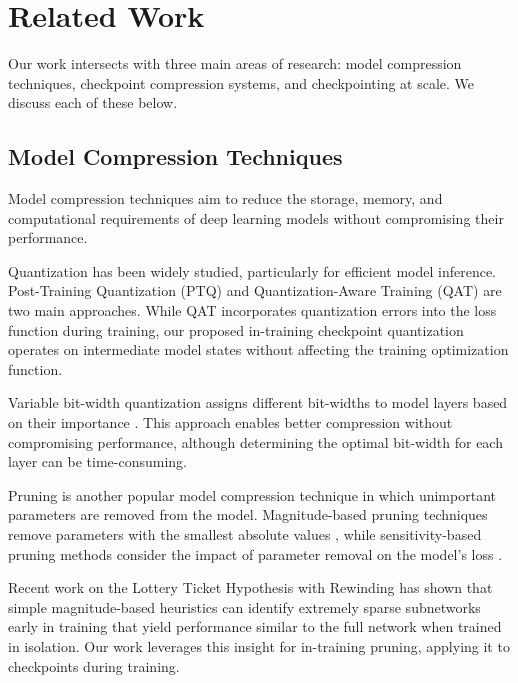 \section{Related Work}
\label{sec:related}

Our work intersects with three main areas of research: model compression techniques, checkpoint compression systems, and checkpointing at scale. We discuss each of these below.

\subsection{Model Compression Techniques} Model compression techniques aim to reduce the storage, memory, and computational requirements of deep learning models without compromising their performance. %

 Quantization has been widely studied, particularly for efficient model inference. Post-Training Quantization (PTQ) \cite{banner2019post, cai2020zeroq, fang2020post, lowBitQuantization, He2018ECCV} and Quantization-Aware Training (QAT) \cite{courbariaux2015binaryconnect, gysel2016hardware, NIPS2016d8330f85, lin2015neural, rastegari2016xnor, tailor2020degree} are two main approaches. While QAT incorporates quantization errors into the loss function during training, our proposed in-training checkpoint quantization operates on intermediate model states without affecting the training optimization function.

Variable bit-width quantization assigns different bit-widths to model layers based on their importance \cite{faghri2020adaptive, kadambi2020comparing, choi2016towards, NEURIPS2020d77c7035, dong2019hawq, li2018optimization}. This approach enables better compression without compromising performance, although determining the optimal bit-width for each layer can be  time-consuming.

 Pruning is another popular model compression technique in which unimportant parameters are removed from the model. Magnitude-based pruning techniques remove parameters with the smallest absolute values \cite{han2015learning}, while sensitivity-based pruning methods consider the impact of parameter removal on the model's loss \cite{sen-5, sen-6, sen-7, sen-1}.

Recent work on the Lottery Ticket Hypothesis with Rewinding \cite{lth} has shown that simple magnitude-based heuristics can identify extremely sparse subnetworks early in training that yield performance similar to the full network when trained in isolation. Our work leverages this insight for in-training pruning, applying it to checkpoints during training.

